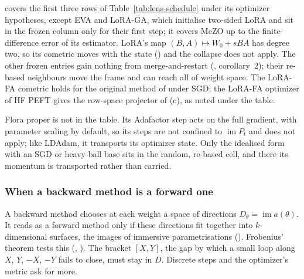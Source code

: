  covers the first three rows of Table~\ref{tab:lens-schedule} under its optimizer hypotheses,
except EVA and LoRA-GA, which initialise two-sided LoRA and sit in the frozen column only for their first step; it
covers MeZO up to the finite-difference error of its estimator. LoRA's map $(B,A)\mapsto W_0+sBA$ has degree
two, so its cometric moves with the state () and the collapse does not apply. The other
frozen entries gain nothing from merge-and-restart (, corollary~2); their re-based neighbours move
the frame and can reach all of weight space. The LoRA-FA cometric holds for the original method of
\citet{zhang2023lora} under SGD; the LoRA-FA optimizer of HF PEFT \citep{xmangrulkar2022peft} gives the row-space projector of
(c), as noted under the table.

Flora proper is not in the table. Its Adafactor step acts on the full gradient, with parameter scaling by default, so
its steps are not confined to $\operatorname{im}P_t$ and  does not apply; like LDAdam, it
transports its optimizer state. Only the idealised form with an SGD or heavy-ball base sits in the random, re-based
cell, and there its momentum is transported rather than carried.

\subsubsection{When a backward method is a forward one}\label{sec:lens-integrability}

A backward method chooses at each weight a space of directions $D_\theta=\operatorname{im}a(\theta)$. It reads as a
forward method only if these directions fit together into $k$-dimensional surfaces, the images of immersive
parametrisations (). Frobenius' theorem tests this (, ). The bracket $[X,Y]$, the gap by which a
small loop along $X$, $Y$, $-X$, $-Y$ fails to close, must stay in $D$. Discrete steps and the optimizer's metric ask
for more.


